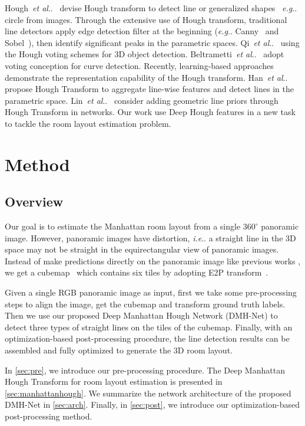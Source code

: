 \documentclass[runningheads]{llncs}
\makeatletter
\DeclareRobustCommand\onedot{\futurelet\@let@token\@onedot}
\def\@onedot{\ifx\@let@token.\else.\null\fi\xspace}
\def\eg{\emph{e.g}\onedot} \def\Eg{\emph{E.g}\onedot}
\def\ie{\emph{i.e}\onedot} \def\Ie{\emph{I.e}\onedot}
\def\etal{\emph{et al}\onedot}
\makeatother
\begin{document}
 Hough~\etal~\cite{hough1962method} devise Hough transform to detect line or generalized shapes~\cite{ballard1981generalizing} \eg circle from images. Through the extensive use of Hough transform, traditional line detectors apply edge detection filter at the beginning (\eg Canny~\cite{canny1986computational} and Sobel~\cite{sobel19683x3}), then identify signiﬁcant peaks in the parametric spaces. Qi~\etal~\cite{qi2019deep} using the Hough voting schemes for 3D object detection. Beltrametti~\etal~\cite{beltrametti2020geometry} adopt voting conception for curve detection.
Recently, learning-based approaches demonstrate the representation capability of the Hough transform. Han~\etal~\cite{han2020deep} propose Hough Transform to aggregate line-wise features and detect lines in the parametric space. Lin~\etal~\cite{lin2020deep} consider adding geometric line priors through Hough Transform in networks. Our work use Deep Hough features in a new task to tackle the room layout estimation problem. \section{Method}
\subsection{Overview}

Our goal is to estimate the Manhattan room layout from a single $360^\circ$ panoramic image. However, panoramic images have distortion, \ie a straight line in the 3D space may not be straight in the equirectangular view of panoramic images. Instead of make predictions directly on the panoramic image like previous works \cite{zou2018layoutnet,sun2019horizonnet,Wang_2021_LED2Net,Sun_2021_HoHoNet}, we get a cubemap~\cite{ng2005data} which contains six tiles by adopting E2P transform~\cite{ng2005data,yang2019dula}.

Given a single RGB panoramic image as input, first we take some pre-processing steps to align the image, get the cubemap and transform ground truth labels.
Then we use our proposed Deep Manhattan Hough Network (DMH-Net) to detect three types of straight lines on the tiles of the cubemap. 
Finally, with an optimization-based post-processing procedure, the line detection results can be assembled and fully optimized to generate the 3D room layout.

In \cref{sec:pre}, we introduce our pre-processing procedure.
The Deep Manhattan Hough Transform for room layout estimation is presented in \cref{sec:manhattanhough}.
We summarize the network architecture of the proposed DMH-Net in \cref{sec:arch}.
Finally, in \cref{sec:post}, we introduce our optimization-based post-processing method.
\end{document}
